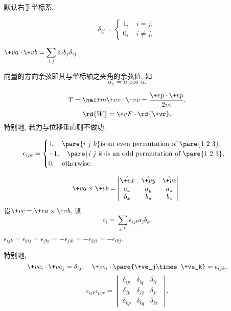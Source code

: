 \documentclass{ctexart}
\begin{document}
默认右手坐标系.
\begin{definition}
    \[ \delta_{ij} = \begin{cases}
        1,\quad i=j,\\
        0,\quad i\neq j.
    \end{cases} \]
\end{definition}
\begin{ex}
    \hfill $\displaystyle \+va\cdot\+vb = \sum_{i,j} a_ib_j\delta_{ij}.$ \hfill\mbox{}
\end{ex}
\begin{definition}
    向量的方向余弦即其与坐标轴之夹角的余弦值, 如
    \[ a_x = a\cos\alpha. \]
\end{definition}
\begin{ex}[动能与功的表示]
    \[ T = \half m\+vv\cdot\+vv = \frac{\+vp\cdot\+vp}{2m}. \]
    \[ \rd{W} = \+vF\cdot\rd{\+vr}. \]
    特别地, 若力与位移垂直则不做功.
\end{ex}
\begin{definition}
    \[ \epsilon_{ijk} = \begin{cases}
        1,\quad \pare{i\ j\ k}\text{is an even permutation of } \pare{1\ 2\ 3},\\
        -1,\quad \pare{i\ j\ k}\text{is an odd permutation of } \pare{1\ 2\ 3},\\
        0,\quad \text{otherwise}.
    \end{cases} \]
\end{definition}
\begin{theorem}[叉乘的分量表示]
    \[ \+va\times\+vb = \begin{vmatrix}
        \hat{\+vx} & \hat{\+vy} & \hat{\+vz} \\
        a_x & a_y & a_z \\
        b_x & b_y & b_z
    \end{vmatrix}. \]
    设$\+vc = \+va\times\+vb$, 则
    \[ c_i = \sum_{j,k} \epsilon_{ijk}a_jb_k. \]
\end{theorem}
\begin{ex}
    \hfill $\epsilon_{ijk} = \epsilon_{kij} = \epsilon_{jki} = -\epsilon_{jik} = -\epsilon_{kji} = -\epsilon_{ikj}.$ \hfill\mbox{}
\end{ex}
特别地,
\[ \+ve_i \cdot \+ve_j = \delta_{ij}, \quad \+ve_{i}\cdot\pare{\+ve_j\times \+ve_k} = \epsilon_{ijk}. \]
\[ \epsilon_{ijk}\epsilon_{pqr} = \begin{vmatrix}
    \delta_{ip} & \delta_{iq} & \delta_{ir} \\
    \delta_{jp} & \delta_{jq} & \delta_{jr} \\
    \delta_{kp} & \delta_{kq} & \delta_{kr}
\end{vmatrix}. \]
\end{document}
